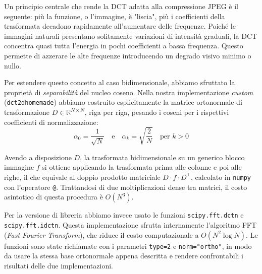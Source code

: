 \documentclass[11pt,a4paper]{article}
\makeatletter
\let\@origtexttt\texttt
\renewcommand{\texttt}[1]{{\def\_{\textunderscore\discretionary{}{}{}}\@origtexttt{#1}}}
\makeatother
\begin{document}
Un principio centrale che rende la DCT adatta alla compressione JPEG è il seguente: più la funzione,
o l'immagine, è "liscia", più i coefficienti della trasformata decadono rapidamente all'aumentare delle frequenze.
Poiché le immagini naturali presentano solitamente variazioni di intensità graduali, la DCT concentra quasi tutta
l'energia in pochi coefficienti a bassa frequenza. Questo permette di azzerare
le alte frequenze introducendo un degrado visivo minimo o nullo.

Per estendere questo concetto al caso bidimensionale, abbiamo sfruttato la proprietà di \emph{separabilità}
del nucleo coseno. Nella nostra implementazione \emph{custom} (\texttt{dct\_2d\_homemade}) abbiamo costruito
esplicitamente la matrice ortonormale di trasformazione $D \in \mathbb{R}^{N \times N}$, riga per riga,
pesando i coseni per i rispettivi coefficienti di normalizzazione:
\[
\alpha_0 = \frac{1}{\sqrt{N}} \quad \text{e} \quad \alpha_k = \sqrt{\frac{2}{N}} \quad \text{per } k > 0
\]

Avendo a disposizione $D$, la trasformata bidimensionale su un generico blocco immagine $f$ si ottiene applicando
la trasformata prima alle colonne e poi alle righe, il che equivale al doppio prodotto matriciale
$D \cdot f \cdot D^\top$, calcolato in \texttt{numpy} con l'operatore \texttt{@}. Trattandosi di due
moltiplicazioni dense tra matrici, il costo asintotico di questa procedura è $O(N^3)$.

Per la versione di libreria abbiamo invece usato le funzioni \texttt{scipy.fft.dctn} e \texttt{scipy.fft.idctn}.
Questa implementazione sfrutta internamente l'algoritmo FFT (\textit{Fast Fourier Transform}),
che riduce il costo computazionale a $O(N^2 \log N)$.
Le funzioni sono state richiamate con i parametri \texttt{type=2} e
\texttt{norm="ortho"}, in modo da usare la stessa base ortonormale appena descritta e rendere
confrontabili i risultati delle due implementazioni.
\end{document}
